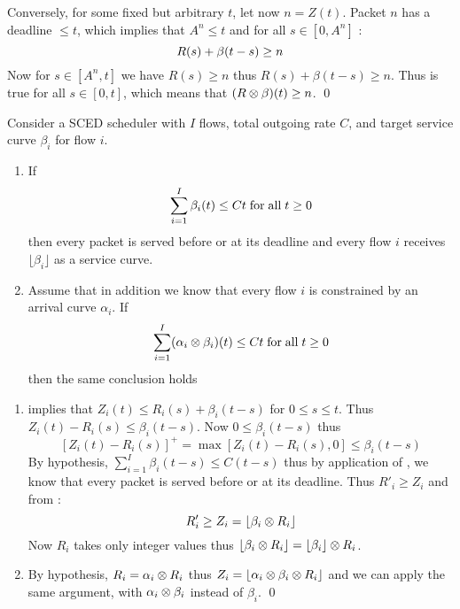 Conversely, for some fixed but arbitrary $t$, let now $n=Z(t)$.
Packet $n$ has a deadline $\leq t$, which implies that $A^n \leq
t$ and for all  $s \in [0,A^n]$ :
\begin{equation}\mylabel{eq-sced-sercur}
R(s) + \beta(t-s) \geq n
\end{equation}
Now for $s \in [A^n, t]$ we have  $R(s) \geq n$ thus $R(s) +
\beta(t-s) \geq n $. Thus  is true for all $s
\in [0,t]$, which means that $(R \otimes \beta)(t) \geq n$. \qed

\begin{theorem}
Consider a SCED scheduler with $I$ flows, total outgoing rate $C$,
and target service curve $\beta_i$ for flow $i$.
\begin{enumerate}
  \item If
\begin{equation}\mylabel{eq-schedofsced-1}
 \sum_{i=1}^I \beta_i(t) \leq Ct \mfa t \geq 0
\end{equation}
then every packet is served before or at its deadline and every
flow $i$
  receives $\lfloor \beta_i \rfloor$ as a service curve.
  \item Assume that in addition we know that every flow $i$ is constrained
  by an arrival curve $\alpha_i$. If
  \begin{equation}\mylabel{eq-schedofsced-2}
 \sum_{i=1}^I (\alpha_i \mpc \beta_i)(t) \leq Ct \mfa t \geq 0
\end{equation}
  then the same conclusion holds
\end{enumerate}
\end{theorem}
\pr
\begin{enumerate}
  \item {} implies that $Z_i(t) \leq R_i(s) +
  \beta_i(t-s)$ for $0 \leq s \leq t$. Thus $Z_i(t) - R_i(s) \leq
  \beta_i(t-s)$. Now $0 \leq \beta_i(t-s)$ thus
  $$
  [Z_i(t) - R_i(s)]^+ = \max [ Z_i(t) - R_i(s),0] \leq \beta_i(t-s)
  $$
  By hypothesis, $\sum_{i=1}^I \beta_i(t-s) \leq C(t-s)$ thus by
  application of , we know that every packet is
  served before or at its deadline. Thus $R'_i  \geq Z_i$ and from
  :
  $$
  R'_i  \geq Z_i  = \lfloor \beta_i \otimes R_i \rfloor
  $$
 Now $R_i$ takes only integer values thus $\lfloor \beta_i \otimes R_i
 \rfloor= \lfloor \beta_i \rfloor  \otimes R_i$.
  \item By hypothesis, $R_i = \alpha_i \otimes R_i  $ thus
  $Z_i=\lfloor \alpha_i \otimes \beta_i  \otimes R_i \rfloor$ and we can
  apply the same argument, with $ \alpha_i \otimes  \beta_i$ instead of
$\beta_i$. \qed
\end{enumerate}

